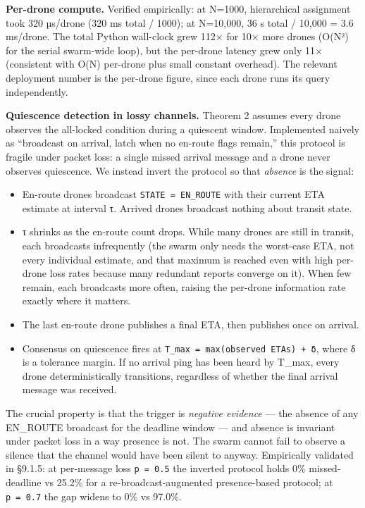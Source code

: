 \textbf{Per-drone compute.} Verified empirically: at N=1000,
hierarchical assignment took 320 µs/drone (320 ms total / 1000); at
N=10,000, 36 s total / 10,000 = 3.6 ms/drone. The total Python
wall-clock grew 112× for 10× more drones (O(N²) for the serial
swarm-wide loop), but the per-drone latency grew only 11× (consistent
with O(N) per-drone plus small constant overhead). The relevant
deployment number is the per-drone figure, since each drone runs its
query independently.

\textbf{Quiescence detection in lossy channels.} Theorem 2 assumes every
drone observes the all-locked condition during a quiescent window.
Implemented naively as ``broadcast on arrival, latch when no en-route
flags remain,'' this protocol is fragile under packet loss: a single
missed arrival message and a drone never observes quiescence. We instead
invert the protocol so that \emph{absence} is the signal:

\begin{itemize}
\tightlist
\item
  En-route drones broadcast \texttt{STATE\ =\ EN\_ROUTE} with their
  current ETA estimate at interval τ. Arrived drones broadcast nothing
  about transit state.
\item
  τ shrinks as the en-route count drops. While many drones are still in
  transit, each broadcasts infrequently (the swarm only needs the
  worst-case ETA, not every individual estimate, and that maximum is
  reached even with high per-drone loss rates because many redundant
  reports converge on it). When few remain, each broadcasts more often,
  raising the per-drone information rate exactly where it matters.
\item
  The last en-route drone publishes a final ETA, then publishes once on
  arrival.
\item
  Consensus on quiescence fires at
  \texttt{T\_max\ =\ max(observed\ ETAs)\ +\ δ}, where δ is a tolerance
  margin. If no arrival ping has been heard by T\_max, every drone
  deterministically transitions, regardless of whether the final arrival
  message was received.
\end{itemize}

The crucial property is that the trigger is \emph{negative evidence} ---
the absence of any EN\_ROUTE broadcast for the deadline window --- and
absence is invariant under packet loss in a way presence is not. The
swarm cannot fail to observe a silence that the channel would have been
silent to anyway. Empirically validated in §9.1.5: at per-message loss
\texttt{p\ =\ 0.5} the inverted protocol holds 0\% missed-deadline vs
25.2\% for a re-broadcast-augmented presence-based protocol; at
\texttt{p\ =\ 0.7} the gap widens to 0\% vs 97.0\%.

